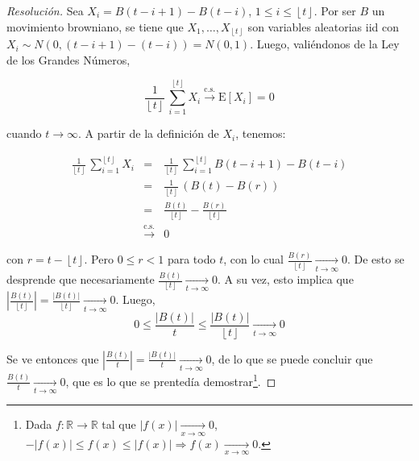 \documentclass[a4paper,11pt]{article}
\newcommand{\floor}[1]{\ensuremath{\left\lfloor #1 \right\rfloor}}
\begin{document}
\begin{proof}[Resoluci\'on]
Sea $X_i = B(t - i + 1) - B(t - i)$, $1 \leq i \leq \floor{t}$. Por ser $B$ un
movimiento browniano, se tiene que $X_1,\dots,X_{\floor{t}}$ son variables
aleatorias iid con $X_i \sim N(0, (t - i + 1) - (t-i)) = N(0,1)$. Luego,
valiéndonos de la Ley de los Grandes Números,

$$\frac{1}{\floor{t}} \, \sum_{i = 1}^{\floor{t}}{X_i}
    \stackrel{\textrm{c.s.}}{\longrightarrow} \textrm{E}[X_i] = 0$$

cuando $t \rightarrow \infty$. A partir de la definición de $X_i$, tenemos:

\begin{eqnarray*}
    \frac{1}{\floor{t}} \, \sum_{i = 1}^{\floor{t}}{X_i} 
    &=& \frac{1}{\floor{t}} \, \sum_{i = 1}^{\floor{t}}{B(t - i + 1) - B(t - i)} \\
    &=& \frac{1}{\floor{t}} \, \left(B(t) - B(r)\right) \\
    &=& \frac{B(t)}{\floor{t}} - \frac{B(r)}{\floor{t}} \\
    &\stackrel{\textrm{c.s.}}{\longrightarrow}& 0
\end{eqnarray*}

con $r = t - \floor{t}$. Pero $0 \leq r < 1$ para todo $t$, con lo cual
$\frac{B(r)}{\floor{t}} \underset{t \to \infty}{\longrightarrow} 0$. 
De esto se desprende que necesariamente
$\frac{B(t)}{\floor{t}} \underset{t \to \infty}{\longrightarrow} 0$.
A su vez, esto implica que
$\left| \frac{B(t)}{\floor{t}} \right| =
\frac{\left|B(t)\right|}{\floor{t}}
\underset{t \to \infty}{\longrightarrow} 0$. Luego,
$$0 \leq \frac{\left|B(t)\right|}{t} \leq 
\frac{\left|B(t)\right|}{\floor{t}} \underset{t \to \infty}{\longrightarrow} 0$$

Se ve entonces que 
$\left| \frac{B(t)}{t} \right| =
\frac{|B(t)|}{t} \underset{t \to \infty}{\longrightarrow} 0$, de lo que se
puede concluir que $\frac{B(t)}{t} \underset{t \to \infty}{\longrightarrow} 0$,
que es lo que se prentedía demostrar\footnote
{Dada $f : \mathbb{R} \to \mathbb{R}$ tal que $|f(x)|
\underset{x \to \infty}{\longrightarrow} 0$,
$-|f(x)| \leq f(x) \leq |f(x)| \Rightarrow
f(x) \underset{x \to \infty}{\longrightarrow} 0$.}.


\end{proof}
\end{document}
